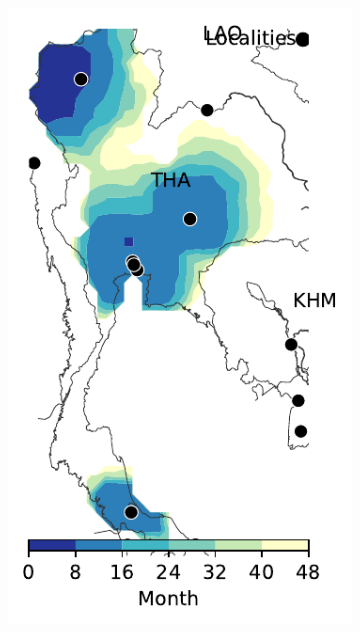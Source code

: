 \documentclass[11pt]{article}
\theoremstyle{definition}
\begin{document}
\begin{figure}[ht]
\begin{subfigure}[b]{.135\textwidth}
    \includegraphics[width=\textwidth]{../../cellular_automata/results/contour/TH_model-B_precip1_m1_l3.pdf}
\caption{\label{fig:thlBContour}} %
\end{subfigure}
\begin{subfigure}[b]{.135\textwidth}

\end{subfigure}
\end{figure}
\end{document}
